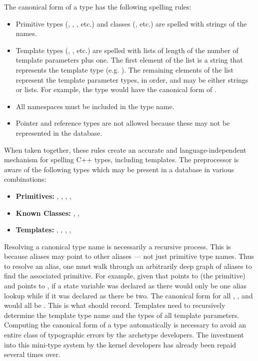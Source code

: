 The canonical form of a type has the following spelling rules:
\begin{itemize}
    \item Primitive types (, , , etc.) 
          and classes (, etc.) are spelled with strings 
          of the names.
    \item Template types (, , etc.) are spelled 
          with lists of length of the number of template parameters plus one.
          The first element of the list is a string that represents the 
          template type (e.g. ). The remaining elements of 
          the list represent the template parameter types, in order, and may 
          be either strings or lists.  For example, the type 
           would have the canonical form 
          of .
    \item All namespaces must be included in the type name.
    \item Pointer and reference types are not allowed because these may not be 
          represented in the database.
\end{itemize}
When taken together, these rules create an accurate and language-independent
mechanism for spelling C++ types, including templates. The preprocessor is aware
of the following types which may be present in a \cyclus database in various 
combinations:
\begin{itemize}
    \item \textbf{Primitives:} , , , , 
    \item \textbf{Known Classes:} , , 
    \item \textbf{Templates:} , , , 
                              , 
\end{itemize}

Resolving a canonical type name is necessarily a recursive process.
This is because aliases may point to other aliases --- not just primitive type names.
Thus to resolve an alias, one must walk through an arbitrarily deep graph of aliases 
to find the associated primitive.  For example, given that  points 
to  (the primitive) and  points to , 
if a state variable was declared as  there would only be one 
alias lookup while if it was declared as  there be two. The canonical
form for all , , and  would all be 
.  This is what \cycpp should record.  Templates need to recursively 
determine the template type name and the types of all template parameters.
Computing the canonical form of a type automatically is necessary to avoid an 
entire class of typographic errors by the archetype developers.  The investment
into this mini-type system by the kernel developers has already been repaid several 
times over.

